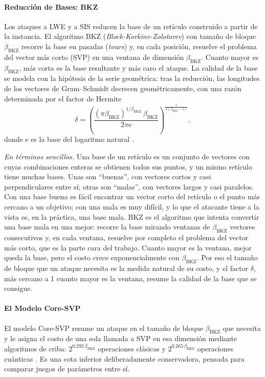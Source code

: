 \paragraph{Reducción de Bases: BKZ}
Los ataques a LWE y a SIS reducen la base de un retículo construido a partir de la instancia. El algoritmo BKZ (\textit{Block-Korkine-Zolotarev}) con tamaño de bloque $\beta_{\mathrm{BKZ}}$ recorre la base en pasadas (\textit{tours}) y, en cada posición, resuelve el problema del vector más corto (SVP) en una ventana de dimensión $\beta_{\mathrm{BKZ}}$. Cuanto mayor es $\beta_{\mathrm{BKZ}}$, más corta es la base resultante y más caro el ataque. La calidad de la base se modela con la hipótesis de la serie geométrica: tras la reducción, las longitudes de los vectores de Gram--Schmidt decrecen geométricamente, con una razón determinada por el factor de Hermite
\begin{equation}
\delta = \left(\frac{(\pi \beta_{\mathrm{BKZ}})^{1/\beta_{\mathrm{BKZ}}}\, \beta_{\mathrm{BKZ}}}{2\pi \mathrm{e}}\right)^{\frac{1}{2(\beta_{\mathrm{BKZ}}-1)}},
\end{equation}
donde $\mathrm{e}$ es la base del logaritmo natural \cite{avanzi2021kyber}.

\textit{En términos sencillos.} Una base de un retículo es un conjunto de vectores con cuyas combinaciones enteras se obtienen todos sus puntos, y un mismo retículo tiene muchas bases. Unas son ``buenas'', con vectores cortos y casi perpendiculares entre sí; otras son ``malas'', con vectores largos y casi paralelos. Con una base buena es fácil encontrar un vector corto del retículo o el punto más cercano a un objetivo; con una mala es muy difícil, y lo que el atacante tiene a la vista es, en la práctica, una base mala. BKZ es el algoritmo que intenta convertir una base mala en una mejor: recorre la base mirando ventanas de $\beta_{\mathrm{BKZ}}$ vectores consecutivos y, en cada ventana, resuelve por completo el problema del vector más corto, que es la parte cara del trabajo. Cuanto mayor es la ventana, mejor queda la base, pero el costo crece exponencialmente con $\beta_{\mathrm{BKZ}}$. Por eso el tamaño de bloque que un ataque necesita es la medida natural de su costo, y el factor $\delta$, más cercano a 1 cuanto mayor es la ventana, resume la calidad de la base que se consigue.

\paragraph{El Modelo Core-SVP}
El modelo Core-SVP resume un ataque en el tamaño de bloque $\beta_{\mathrm{BKZ}}$ que necesita y le asigna el costo de una sola llamada a SVP en esa dimensión mediante algoritmos de criba: $2^{0.292\,\beta_{\mathrm{BKZ}}}$ operaciones clásicas y $2^{0.265\,\beta_{\mathrm{BKZ}}}$ operaciones cuánticas \cite{alkim2016newhope}. Es una cota inferior deliberadamente conservadora, pensada para comparar juegos de parámetros entre sí.

